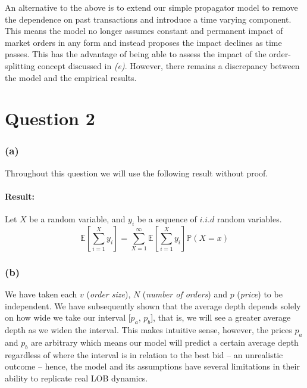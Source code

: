 \documentclass{article}
\begin{document}
An alternative to the above is to extend our simple propagator model to remove the dependence on past transactions and introduce a time varying component. This means the model no longer assumes constant and permanent impact of market orders in any form and instead proposes the impact declines as time passes. This has the advantage of being able to assess the impact of the order-splitting concept discussed in \textit{(e)}. However, there remains a discrepancy between the model and the empirical results. 

\newpage

\section*{Question 2}

\subsubsection*{(a)}
Throughout this question we will use the following result without proof. 

\paragraph{Result:}
Let $X$ be a random variable, and $y_i$ be a sequence of $i.i.d$ random variables.
\begin{equation}
    \mathbb{E} \left[ \sum_{i=1}^{X} y_i \right] = 
    \sum_{X=1}^{\infty} \mathbb{E} \left[ \sum_{i=1}^{X} y_i \right] \mathbb{P}(X=x)
\end{equation}

\subsubsection*{(b)}
We have taken each $v$ (\textit{order size}), $N$ (\textit{number of orders}) and $p$ (\textit{price}) to be independent. We have subsequently shown that the average depth depends solely on how wide we take our interval [$p_a$, $p_b$], that is, we will see a greater average depth as we widen the interval. This makes intuitive sense, however, the prices $p_a$ and $p_b$ are arbitrary which means our model will predict a certain average depth regardless of where the interval is in relation to the best bid – an unrealistic outcome – hence, the model and its assumptions have several limitations in their ability to replicate real LOB dynamics. \\
\end{document}
